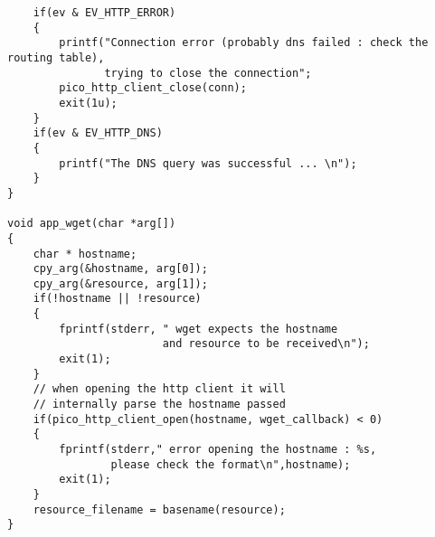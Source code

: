 \begin{verbatim}
    if(ev & EV_HTTP_ERROR)
    {
        printf("Connection error (probably dns failed : check the routing table),
               trying to close the connection";
        pico_http_client_close(conn);
        exit(1u);
    }
    if(ev & EV_HTTP_DNS)
    {
        printf("The DNS query was successful ... \n");
    }
}

void app_wget(char *arg[])
{
    char * hostname;
    cpy_arg(&hostname, arg[0]);
    cpy_arg(&resource, arg[1]);
    if(!hostname || !resource)
    {
        fprintf(stderr, " wget expects the hostname
                        and resource to be received\n");
        exit(1);
    }
    // when opening the http client it will
    // internally parse the hostname passed
    if(pico_http_client_open(hostname, wget_callback) < 0)
    {
        fprintf(stderr," error opening the hostname : %s,
                please check the format\n",hostname);
        exit(1);
    }
    resource_filename = basename(resource);
}
\end{verbatim}


